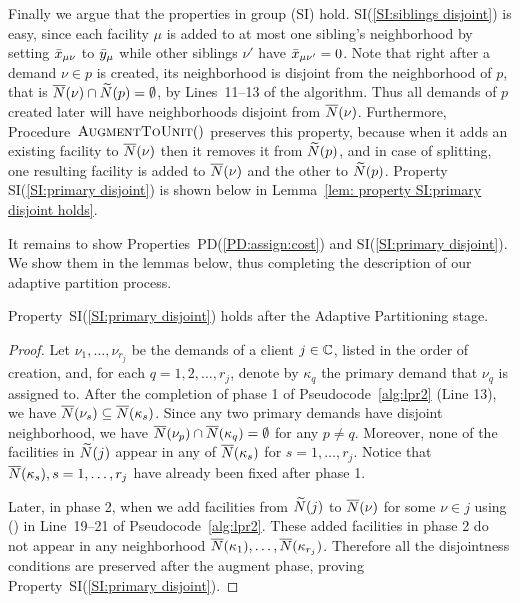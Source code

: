 \documentclass[11pt]{article}
\begin{document}
Finally we argue that the properties in group (SI)
hold. SI(\ref{SI:siblings disjoint}) is easy, since each
facility $\mu$ is added to at most one sibling's
neighborhood by setting ${\bar x}_{\mu\nu}$ to ${\bar y}_\mu$
while other siblings $\nu'$ have ${\bar x}_{\mu\nu'}=0$. Note
that right after a demand $\nu\in p$ is created, its
neighborhood is disjoint from the neighborhood of $p$, that
is ${\overline{N}}(\nu)\cap {\widetilde N}(p) = \emptyset$, by
Lines~11--13 of the algorithm. Thus all demands of $p$
created later will have neighborhoods disjoint from
${\overline{N}}(\nu)$. Furthermore, Procedure~${\textsc{AugmentToUnit}}()$
preserves this property, because when it adds an existing
facility to ${\overline{N}}(\nu)$ then it removes it from
${\widetilde N}(p)$, and in case of splitting, one resulting
facility is added to ${\overline{N}}(\nu)$ and the other to
${\widetilde N}(p)$. Property SI(\ref{SI:primary disjoint}) is shown
below in Lemma~\ref{lem: property SI:primary disjoint holds}.

It remains to show Properties~PD(\ref{PD:assign:cost}) and
SI(\ref{SI:primary disjoint}). We show them in the lemmas
below, thus completing the description of our adaptive
partition process.




\begin{lemma}\label{lem: property SI:primary disjoint holds}
  Property~SI(\ref{SI:primary disjoint}) holds after the
  Adaptive Partitioning stage.
\end{lemma}
\begin{proof}
  Let $\nu_1,\ldots,\nu_{r_j}$ be the demands of a client
  $j\in\mathbb{C}$, listed in the order of creation, and,
  for each $q=1,2,\ldots,r_j$, denote by $\kappa_q$ the
  primary demand that $\nu_q$ is assigned to. After the
  completion of phase 1 of Pseudocode~\ref{alg:lpr2} (Line
  13), we have ${\overline{N}}(\nu_s)\subseteq
  {\overline{N}}(\kappa_s)$. Since any two primary demands have
  disjoint neighborhood, we have ${\overline{N}}(\nu_p) \cap
  {\overline{N}}(\kappa_q) = \emptyset$ for any $p\neq q$. Moreover,
  none of the facilities in ${\widetilde N}(j)$ appear in any of
  ${\overline{N}}(\kappa_s)$ for $s=1,\ldots,r_j$. Notice that
  ${\overline{N}}(\kappa_s), s=1,\ldots,r_j$ have already been fixed
  after phase 1.

  Later, in phase 2, when we add facilities from
  ${\widetilde N}(j)$ to ${\overline{N}}(\nu)$ for some $\nu\in j$ using
  \AugmentToUnit() in Line~19--21 of
  Pseudocode~\ref{alg:lpr2}. These added facilities in phase
  2 do not appear in any neighborhood ${\overline{N}}(\kappa_1),
  \ldots, {\overline{N}}(\kappa_{r_j})$.
  Therefore all the disjointness conditions are preserved
  after the augment phase, proving
  Property~SI(\ref{SI:primary disjoint}).
\end{proof}
\end{document}
